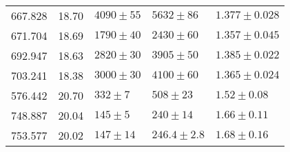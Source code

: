 \begin{tabular}{|l|l|l|l|l|}
667.828       & 18.70     & $ 4090 \pm 55  $  & $5632 \pm 86   $     &  $1.377 \pm 0.028$ \\
671.704       & 18.69     & $ 1790 \pm 40  $  & $2430 \pm 60   $     &  $1.357 \pm 0.045$ \\
692.947       & 18.63     & $ 2820 \pm 30  $  & $3905 \pm 50   $     &  $1.385 \pm 0.022$ \\
703.241       & 18.38     & $ 3000 \pm 30  $  & $4100 \pm 60   $     &  $1.365 \pm 0.024$ \\
576.442       & 20.70     & $ 332 \pm 7    $  & $508 \pm 23    $     &  $1.52 \pm 0.08  $ \\
748.887       & 20.04     & $ 145  \pm 5   $  & $240 \pm 14    $     &  $1.66 \pm 0.11  $ \\
753.577       & 20.02     & $ 147 \pm 14   $  & $246.4 \pm 2.8 $     &  $1.68 \pm 0.16  $ \\
\hline
\end{tabular}